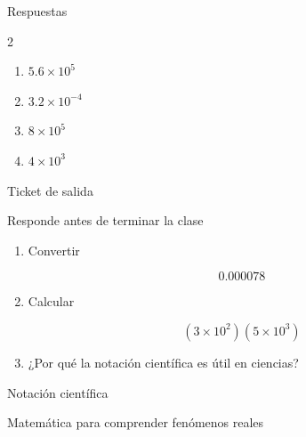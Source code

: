 \documentclass[aspectratio=169,10pt,handout]{beamer}
\begin{document}
	\begin{frame}{Respuestas}
		
		\begin{multicols}{2}
			
			\begin{enumerate}
				
				\item \(5.6\times10^5\)
				
				\item \(3.2\times10^{-4}\)
				
				\item \(8\times10^5\)
				
				\item \(4\times10^3\)
				
			\end{enumerate}
			
		\end{multicols}
		
	\end{frame}
	
	\begin{frame}{Ticket de salida}
		
		\begin{block}{Responde antes de terminar la clase}
			
			\begin{enumerate}
				
				\item Convertir
				
				\[
				0.000078
				\]
				
				\item Calcular
				
				\[
				(3\times10^2)(5\times10^3)
				\]
				
				\item ¿Por qué la notación científica es útil en ciencias?
				
			\end{enumerate}
			
		\end{block}
		
	\end{frame}
	
	\begin{frame}
		
		\centering
		
		{\Huge\color{USTTeal}\faSeedling}
		
		\vspace{0.3cm}
		
		{\Large Notación científica}
		
		\vspace{0.3cm}
		
		{\small Matemática para comprender fenómenos reales}
		
	\end{frame}
	
\end{document}
